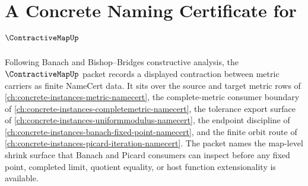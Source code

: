 \chapter{A Concrete Naming Certificate for $\ContractiveMapUp$}
\label{ch:concrete-instances-contractive-map-namecert}

Following Banach and Bishop--Bridges constructive analysis, the $\ContractiveMapUp$ packet records a displayed contraction between metric carriers as finite NameCert data. It sits over the source and target metric rows of \autoref{ch:concrete-instances-metric-namecert}, the complete-metric consumer boundary of \autoref{ch:concrete-instances-completemetric-namecert}, the tolerance export surface of \autoref{ch:concrete-instances-uniformmodulus-namecert}, the endpoint discipline of \autoref{ch:concrete-instances-banach-fixed-point-namecert}, and the finite orbit route of \autoref{ch:concrete-instances-picard-iteration-namecert}. The packet names the map-level shrink surface that Banach and Picard consumers can inspect before any fixed point, completed limit, quotient equality, or host function extensionality is available.

